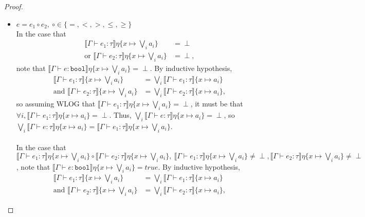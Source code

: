 \begin{proof}
\begin{itemize}
  \item $e = e_1 \circ e_2, \ \circ \in \{=,<,>,\leq,\geq\}$\\ 
  In the case that 
 \begin{align*}
  \llbracket \Gamma \vdash e_1 : \tau \rrbracket\eta\{x\mapsto  \bigvee_i a_i\} &= \perp \\ 
  \text{or }  \llbracket \Gamma \vdash e_2 : \tau \rrbracket\eta\{x\mapsto  \bigvee_i a_i\} &= \perp,
  \end{align*} 
  note that $\llbracket \Gamma \vdash e : \texttt{bool}\rrbracket\eta\{x\mapsto  \bigvee_i a_i\} = \perp$. 
  By inductive hypothesis, 
  \begin{align*}
  \llbracket \Gamma \vdash e_1 : \tau \rrbracket\{x\mapsto  \bigvee_i a_i\} &= \bigvee_i\llbracket \Gamma \vdash e_1 : \tau \rrbracket\{x\mapsto a_i\} \\
 \text{and } \llbracket \Gamma \vdash e_2 : \tau \rrbracket\{x\mapsto  \bigvee_i a_i\} &= \bigvee_i\llbracket \Gamma \vdash e_2 : \tau \rrbracket\{x\mapsto a_i\}, 
  \end{align*}
  so assuming WLOG that $\llbracket \Gamma \vdash e_1 : \tau \rrbracket\eta\{x\mapsto  \bigvee_i a_i\} = \perp$, 
  it must be that \\
  $\forall i, \llbracket \Gamma \vdash e_1 : \tau \rrbracket\eta\{x\mapsto a_i\} = \perp$. 
  Thus, $\bigvee_i\llbracket \Gamma \vdash e : \tau \rrbracket\eta\{x\mapsto a_i\} = \perp$, so \\
  $\bigvee_i\llbracket \Gamma \vdash e : \tau \rrbracket\eta\{x\mapsto a_i\} = 
  \llbracket \Gamma \vdash e_1 : \tau \rrbracket\eta\{x\mapsto  \bigvee_i a_i\}$.\\ \\
  In the case that $\llbracket \Gamma \vdash e_1 : \tau \rrbracket\eta\{x\mapsto  \bigvee_i a_i\} 
  \circ \llbracket \Gamma \vdash e_2 : \tau \rrbracket\eta\{x\mapsto  \bigvee_i a_i\}, \ 
  \llbracket \Gamma \vdash e_1:\tau \rrbracket\eta\{x\mapsto  \bigvee_i a_i\} \neq \perp, 
  \llbracket \Gamma \vdash e_2 : \tau \rrbracket\eta\{x\mapsto  \bigvee_i a_i\} \neq \perp$, 
  note that $\llbracket \Gamma \vdash e : \texttt{bool}\rrbracket\eta\{x\mapsto  \bigvee_i a_i\} = true$. 
 By inductive hypothesis, 
  \begin{align*}
  \llbracket \Gamma \vdash e_1 : \tau \rrbracket\{x\mapsto  \bigvee_i a_i\} &= \bigvee_i\llbracket \Gamma \vdash e_1 : \tau \rrbracket\{x\mapsto a_i\} \\
 \text{and } \llbracket \Gamma \vdash e_2 : \tau \rrbracket\{x\mapsto  \bigvee_i a_i\} &= \bigvee_i\llbracket \Gamma \vdash e_2 : \tau \rrbracket\{x\mapsto a_i\}, 

\end{align*}
\end{itemize}
\end{proof}

